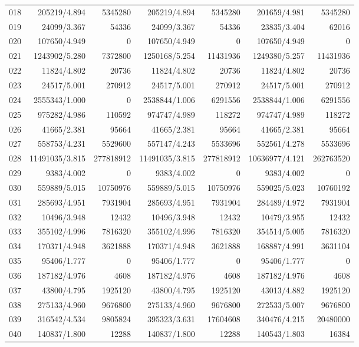 \begin{longtable}{crrrrrr}
018 & 205219/4.894 & 5345280 & 205219/4.894 & 5345280 & 201659/4.981 & 5345280 \\
019 & 24099/3.367 & 54336 & 24099/3.367 & 54336 & 23835/3.404 & 62016 \\
020 & 107650/4.949 & 0 & 107650/4.949 & 0 & 107650/4.949 & 0 \\
021 & 1243902/5.280 & 7372800 & 1250168/5.254 & 11431936 & 1249380/5.257 & 11431936 \\
022 & 11824/4.802 & 20736 & 11824/4.802 & 20736 & 11824/4.802 & 20736 \\
023 & 24517/5.001 & 270912 & 24517/5.001 & 270912 & 24517/5.001 & 270912 \\
024 & 2555343/1.000 & 0 & 2538844/1.006 & 6291556 & 2538844/1.006 & 6291556 \\
025 & 975282/4.986 & 110592 & 974747/4.989 & 118272 & 974747/4.989 & 118272 \\
026 & 41665/2.381 & 95664 & 41665/2.381 & 95664 & 41665/2.381 & 95664 \\
027 & 558753/4.231 & 5529600 & 557147/4.243 & 5533696 & 552561/4.278 & 5533696 \\
028 & 11491035/3.815 & 277818912 & 11491035/3.815 & 277818912 & 10636977/4.121 & 262763520 \\
029 & 9383/4.002 & 0 & 9383/4.002 & 0 & 9383/4.002 & 0 \\
030 & 559889/5.015 & 10750976 & 559889/5.015 & 10750976 & 559025/5.023 & 10760192 \\
031 & 285693/4.951 & 7931904 & 285693/4.951 & 7931904 & 284489/4.972 & 7931904 \\
032 & 10496/3.948 & 12432 & 10496/3.948 & 12432 & 10479/3.955 & 12432 \\
033 & 355102/4.996 & 7816320 & 355102/4.996 & 7816320 & 354514/5.005 & 7816320 \\
034 & 170371/4.948 & 3621888 & 170371/4.948 & 3621888 & 168887/4.991 & 3631104 \\
035 & 95406/1.777 & 0 & 95406/1.777 & 0 & 95406/1.777 & 0 \\
036 & 187182/4.976 & 4608 & 187182/4.976 & 4608 & 187182/4.976 & 4608 \\
037 & 43800/4.795 & 1925120 & 43800/4.795 & 1925120 & 43013/4.882 & 1925120 \\
038 & 275133/4.960 & 9676800 & 275133/4.960 & 9676800 & 272533/5.007 & 9676800 \\
039 & 316542/4.534 & 9805824 & 395323/3.631 & 17604608 & 340476/4.215 & 20480000 \\
040 & 140837/1.800 & 12288 & 140837/1.800 & 12288 & 140543/1.803 & 16384 \\

\end{longtable}
